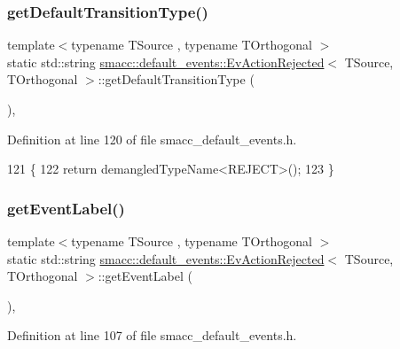 \subsubsection{\texorpdfstring{get\+Default\+Transition\+Type()}{getDefaultTransitionType()}}
{\footnotesize\ttfamily template$<$typename T\+Source , typename T\+Orthogonal $>$ \\
static std\+::string \hyperlink{structsmacc_1_1default__events_1_1EvActionRejected}{smacc\+::default\+\_\+events\+::\+Ev\+Action\+Rejected}$<$ T\+Source, T\+Orthogonal $>$\+::get\+Default\+Transition\+Type (\begin{DoxyParamCaption}{ }\end{DoxyParamCaption})\hspace{0.3cm}{\ttfamily [inline]}, {\ttfamily [static]}}



Definition at line 120 of file smacc\+\_\+default\+\_\+events.\+h.


\begin{DoxyCode}
121   \{
122     \textcolor{keywordflow}{return} demangledTypeName<REJECT>();
123   \}
\end{DoxyCode}
\mbox{\label{structsmacc_1_1default__events_1_1EvActionRejected_a4f29fd240fbc8c6c5d6820fe5dd917ce}} 
\subsubsection{\texorpdfstring{get\+Event\+Label()}{getEventLabel()}}
{\footnotesize\ttfamily template$<$typename T\+Source , typename T\+Orthogonal $>$ \\
static std\+::string \hyperlink{structsmacc_1_1default__events_1_1EvActionRejected}{smacc\+::default\+\_\+events\+::\+Ev\+Action\+Rejected}$<$ T\+Source, T\+Orthogonal $>$\+::get\+Event\+Label (\begin{DoxyParamCaption}{ }\end{DoxyParamCaption})\hspace{0.3cm}{\ttfamily [inline]}, {\ttfamily [static]}}



Definition at line 107 of file smacc\+\_\+default\+\_\+events.\+h.


